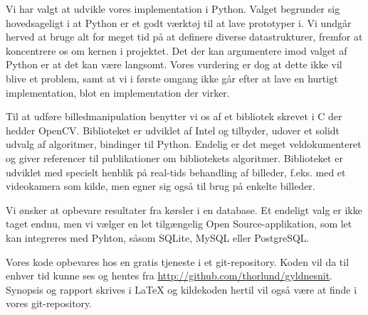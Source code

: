 Vi har valgt at udvikle vores implementation i Python. Valget begrunder
sig hovedsageligt i at Python er et godt værktøj til at lave prototyper
i. Vi undgår herved at bruge alt for meget tid på at definere diverse
datastrukturer, fremfor at koncentrere os om kernen i projektet. Det der
kan argumentere imod valget af Python er at det kan være langsomt. Vores
vurdering er dog at dette ikke vil blive et problem, samt at vi i første
omgang ikke går efter at lave en hurtigt implementation, blot en
implementation der virker.

Til at udføre billedmanipulation benytter vi os af et bibliotek skrevet i C der
hedder OpenCV. Biblioteket er udviklet af Intel og tilbyder, udover et solidt
udvalg af algoritmer, bindinger til Python. Endelig er det meget
veldokumenteret og giver referencer til publikationer om bibliotekets
algoritmer. Biblioteket er udviklet med specielt henblik på real-tids
behandling af billeder, f.eks. med et videokamera som kilde, men egner sig også
til brug på enkelte billeder.

Vi ønsker at opbevare resultater fra kørsler i en database. Et endeligt
valg er ikke taget endnu, men vi vælger en let tilgængelig Open
Source-applikation, som let kan integreres med Pyhton, såsom SQLite, MySQL eller
PostgreSQL.

Vores kode opbevares hos en gratis tjeneste i et git-repository. Koden
vil da til enhver tid kunne ses og hentes fra
\href{http://github.com/thorlund/gyldnesnit}{http://github.com/thorlund/gyldnesnit}.
Synopsis og rapport skrives i \LaTeX{} og kildekoden hertil vil også være
at finde i vores git-repository.
